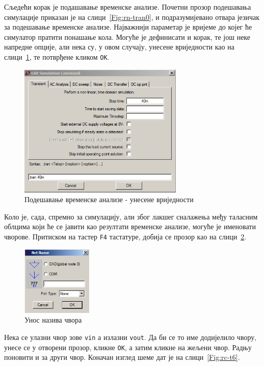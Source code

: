 Сљедећи корак је подашавање временске анализе. Почетни прозор подешавања симулације приказан је на слици~\ref{Fig:rn-tran0}, и подразумијевано отвара језичак за подешавање временске анализе. Најважнији параметар је вријеме до којег ће симулатор пратити понашање кола. Могуће је дефинисати и корак, те још неке напредне опције, али нека су, у овом случају, унесене вриједности као на слици~\ref{Fig:rc-t4}, те потврђене кликом \texttt{OK}.

\begin{figure}[h]
\centering
\includegraphics[width=0.7\textwidth]{figs/rc-t4.PNG}
\caption{Подешавање временске анализе - унесене вриједности}
\label{Fig:rc-t4}
\end{figure}

Коло је, сада, спремно за симулацију, али због лакшег сналажења међу таласним облцима који ће се јавити као резултати временске анализе, могуће је именовати чворове. Притиском на тастер \texttt{F4} тастатуре, добија се прозор као на слици~\ref{Fig:rc-t5}.

\begin{figure}[h]
\centering
\includegraphics[width=0.3\textwidth]{figs/rc-t5.PNG}
\caption{Унос назива чвора}
\label{Fig:rc-t5}
\end{figure}

Нека се улазни чвор зове \texttt{vin} а излазни \texttt{vout}. Да би се то име додијелило чвору, унесе се у отворени прозор, кликне \texttt{OK}, а затим кликне на жељени чвор. Радњу поновити и за други чвор. Коначан изглед шеме дат је на слици~\ref{Fig:rc-t6}.

